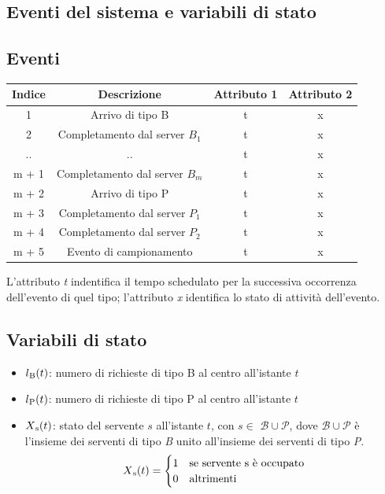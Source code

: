 \documentclass[a4paper, 12pt]{article}
\newcommand{\bup}[0]{$\mathcal{B} \cup \mathcal{P}$}
\begin{document}
\subsection{Eventi del sistema e variabili di stato}
\subsection{Eventi}
\begin{center}
\begin{tabular}{ |c|c|c|c| }
	\hline
    \cellcolor{cellcolor}Indice & \cellcolor{cellcolor}Descrizione & \cellcolor{cellcolor}Attributo 1 & \cellcolor{cellcolor}Attributo 2 \\
    \hline
    \hline
    1 & Arrivo di tipo B & t & x \\
    \hline
    2 & Completamento dal server $B_1$ & t & x \\
    \hline
    .. & .. & t & x \\
    \hline
    m + 1 & Completamento dal server $B_m$ & t & x \\
    \hline
    m + 2 & Arrivo di tipo P & t & x \\
    \hline
    m + 3 & Completamento dal server $P_1$ & t & x \\
    \hline
    m + 4 & Completamento dal server $P_2$ & t & x \\
    \hline
    m + 5 & Evento di campionamento & t & x \\
    \hline
\end{tabular}
\end{center}
L'attributo \emph{t} indentifica il tempo schedulato per la successiva occorrenza
dell'evento di quel tipo; l'attributo \emph{x} identifica lo stato di attività
dell'evento.

\subsection{Variabili di stato}
\begin{itemize}
  \item $l\textsubscript{B}(t)$: numero di richieste di tipo B al centro all'istante $t$
  \item $l\textsubscript{P}(t)$: numero di richieste di tipo P al centro all'istante $t$
  \item $X\textsubscript{s}(t)$: stato del servente $s$ all'istante $t$, 
  con $s \in$ \bup, dove \bup{} è l'insieme dei serventi di tipo \textit{B} unito all'insieme dei serventi di tipo \textit{P}.
  \[
      X\textsubscript{s}(t) = 
  \begin{cases}
      1& \text{se servente s è occupato}\\ 
      0              & \text{altrimenti}
  \end{cases}
  \]	
\end{itemize}
\end{document}
